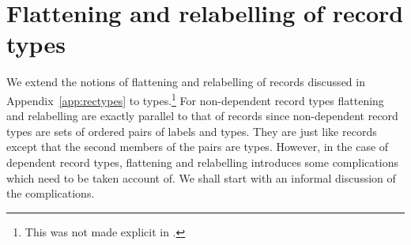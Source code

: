 



\section{Flattening and relabelling of record types}
\label{app:flattening}

We extend the notions of flattening and relabelling of records
discussed in Appendix~\ref{app:rectypes} to types.\footnote{This was
  not made explicit in \cite{Cooper2012}.}  For non-dependent record
types flattening and relabelling are exactly parallel to that of
records since non-dependent record types are sets of ordered pairs of
labels and types.  They are just like records except that the second
members of the pairs are types.  However, in the case of dependent
record types, flattening and relabelling introduces some complications
which need to be taken account of.  We shall start with an informal
discussion of the complications.

